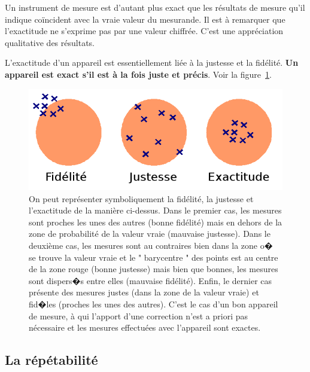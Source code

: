 Un instrument de mesure est d'autant plus exact que les résultats de mesure qu'il indique coïncident avec la vraie valeur du mesurande. Il est à remarquer que l'exactitude ne s'exprime pas par une valeur chiffrée. C'est une appréciation qualitative des résultats.

L'exactitude d'un appareil est essentiellement liée à la justesse et la fidélité. \textbf{Un appareil est exact s'il est à la fois juste et précis}. Voir la figure~\ref{fig:exact}.

\begin{figure}[htbp]
   \centering
   \includegraphics[width=12cm]{assets/figures/Precision_metrologique.png}
   \caption{On peut représenter symboliquement la fidélité, la justesse et l'exactitude de la manière ci-dessus. Dans le premier cas, les mesures sont proches les unes des autres (bonne fidélité) mais en dehors de la zone de probabilité de la valeur vraie (mauvaise justesse). Dans le deuxième cas, les mesures sont au contraires bien dans la zone o� se trouve la valeur vraie et le " barycentre " des points est au centre de la zone rouge (bonne justesse) mais bien que bonnes, les mesures sont dispers�s entre elles (mauvaise fidélité). Enfin, le dernier cas présente des mesures justes (dans la zone de la valeur vraie) et fid�les (proches les unes des autres). C'est le cas d'un bon appareil de mesure, à qui l'apport d'une correction n'est a priori pas nécessaire et les mesures effectuées avec l'appareil sont exactes.}
   \label{fig:exact}
\end{figure}

\subsection{La répétabilité}

